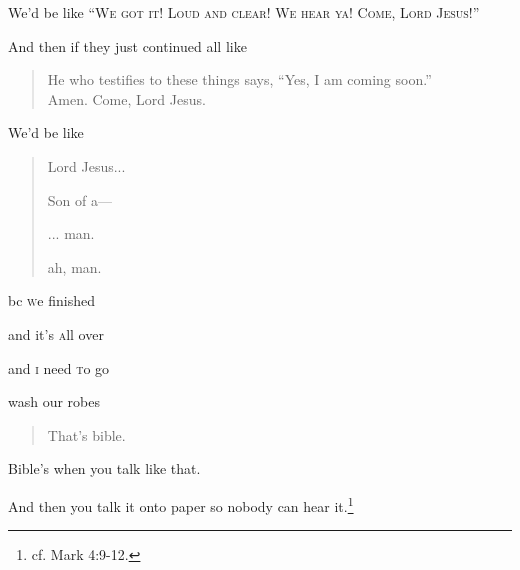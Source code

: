 {{		We'd be like ``\textsc{We got it! Loud and clear! We hear ya! Come, Lord Jesus!}''

		And then if they just continued all like

		\begin{quote}
		He who testifies to these things says, ``Yes, I am coming soon.''\\
		Amen. Come, Lord Jesus.
		\end{quote}

		We'd be like

		\begin{quote}
		\centering
		Lord Jesus...

		Son of a---

		... man.

		ah, man.
		\end{quote}


		bc \textsc{w}e finished

		and it's \textsc{a}ll over

		and \textsc{i} need \textsc{t}o go

		wash our robes

		\begin{quote}
		\centering

		That's bible.

		\end{quote}

		Bible's when you talk like that.

		And then you talk it onto paper so nobody can hear it.\footnote{cf. Mark 4:9-12.}

}}

